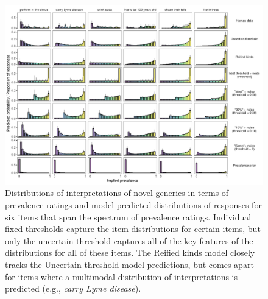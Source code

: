 \documentclass[floatsintext,man]{apa6}
\begin{document}
\begin{figure}
\centering
\includegraphics{figs/genint-fullDistributions-variousFixeds-1.pdf}
\caption{Distributions of interpretations of novel generics in terms of prevalence ratings and model predicted distributions of responses for six items that span the spectrum of prevalence ratings. Individual fixed-thresholds capture the item distributions for certain items, but only the uncertain threshold captures all of the key features of the distributions for all of these items. The Reified kinds model closely tracks the Uncertain threshold model predictions, but comes apart for items where a multimodal distribution of interpretations is predicted (e.g., \emph{carry Lyme disease}).
}
\label{fig:genint-modelingResults-bars}
\end{figure}
\end{document}
